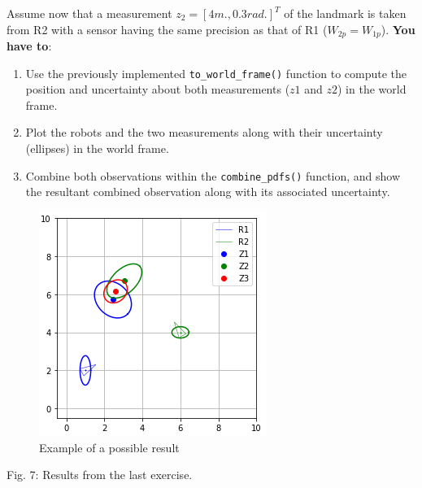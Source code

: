 \documentclass[11pt]{article}
\providecommand{\tightlist}{%
      \setlength{\itemsep}{0pt}\setlength{\parskip}{0pt}}
\begin{document}
Assume now that a measurement \(z_2 = [4 m., 0.3 rad.]^T\) of the
landmark is taken from R2 with a sensor having the same precision as
that of R1 (\(W_{2p}= W_{1p}\)). \textbf{You have to}:

\begin{enumerate}
\def\labelenumi{\arabic{enumi}.}
\tightlist
\item
  Use the previously implemented \texttt{to\_world\_frame()} function to
  compute the position and uncertainty about both measurements (\(z1\)
  and \(z2\)) in the world frame.
\item
  Plot the robots and the two measurements along with their uncertainty
  (ellipses) in the world frame.
\item
  Combine both observations within the \texttt{combine\_pdfs()}
  function, and show the resultant combined observation along with its
  associated uncertainty.
\end{enumerate}

\begin{figure}
\centering
\includegraphics{images/fig4-1-2.png}
\caption{Example of a possible result}
\end{figure}
Fig. 7: Results from the last exercise.
\end{document}
